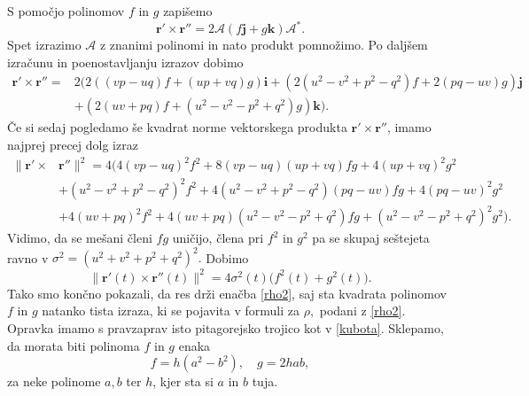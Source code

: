 \documentclass[12pt,a4paper,twoside]{article}
\theoremstyle{definition} %
\theoremstyle{plain} %
\theoremstyle{primerstyle}
\numberwithin{equation}{section}  %
\newcommand{\rV}{\mathbf{r}}
\newcommand{\iV}{\mathbf{i}}
\newcommand{\jV}{\mathbf{j}}
\newcommand{\kV}{\mathbf{k}}
\newcommand{\AQ}{\mathcal{A}}
\begin{document}
 S pomočjo polinomov $f$ in $g$ zapišemo
\begin{equation}
	\label{drtddr}
	\rV'\times\rV''=2\AQ(f\jV+g\kV)\AQ^*.
\end{equation}
Spet izrazimo $\AQ$ z znanimi polinomi in nato produkt pomnožimo. Po daljšem izračunu in poenostavljanju izrazov dobimo
\begin{align*}
	\label{drtddr}
	\rV'\times\rV''=&2 \big (2((vp-uq)f+(up+vq)g)\iV+(2(u^2-v^2+p^2-q^2)f+2(pq-uv)g)\jV \\
	&+(2(uv+pq)f+(u^2-v^2-p^2+q^2)g)\kV \big ).
\end{align*}
Če si sedaj pogledamo še kvadrat norme vektorskega produkta $\rV'\times\rV''$, imamo najprej precej dolg izraz
\begin{align*}
	\lVert\rV'\times&\rV''\rVert^2=4 \Big( 4(vp-uq)^2f^2+8(vp-uq)(up+vq)fg+4(up+vq)^2g^2\\
	&+(u^2-v^2+p^2-q^2)^2f^2+4(u^2-v^2+p^2-q^2)(pq-uv)fg+4(pq-uv)^2g^2\\
	&+4(uv+pq)^2f^2+4(uv+pq)(u^2-v^2-p^2+q^2)fg+(u^2-v^2-p^2+q^2)^2g^2 \Big).
\end{align*}
Vidimo, da se mešani členi $fg$ uničijo, člena pri $f^2$ in $g^2$ pa se skupaj seštejeta ravno v $\sigma^2=(u^2+v^2+p^2+q^2)^2.$ Dobimo
\begin{equation}
	\lVert\rV'(t)\times\rV''(t)\rVert^2=4\sigma^2(t)\big(f^2(t)+g^2(t)\big).
\end{equation}
Tako smo končno pokazali, da res drži enačba \eqref{rho2}, saj sta kvadrata polinomov $f$ in $g$ natanko tista izraza, ki se pojavita v formuli za $\rho,$ podani z \eqref{rho2}. Opravka imamo s pravzaprav isto pitagorejsko trojico kot v \eqref{kubota}. Sklepamo, da morata biti polinoma $f$ in $g$ enaka
\begin{equation}
	\label{polinoma_f_in_g}
	f=h(a^2-b^2),\quad g=2hab,
\end{equation}
za neke polinome $a,b$ ter $h$, kjer sta si $a$ in $b$ tuja.
\end{document}
